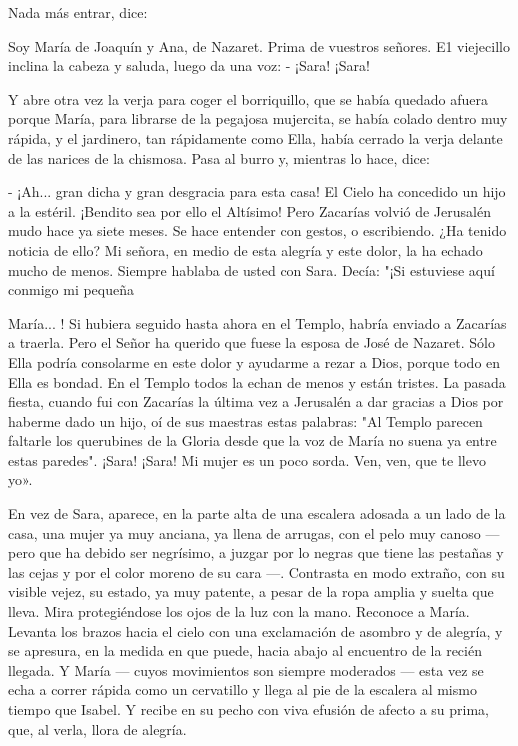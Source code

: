 \documentclass[12pt]{book} %
\begin{document}
Nada más entrar, dice: 

Soy María de Joaquín y Ana, de Nazaret. Prima de vuestros señores. E1 viejecillo inclina la cabeza y saluda, luego da una voz: - ¡Sara! ¡Sara! 

Y abre otra vez la verja para coger el borriquillo, que se había quedado afuera porque María, para librarse de la pegajosa mujercita, se había colado dentro muy rápida, y el jardinero, tan rápidamente como Ella, había cerrado la verja delante de las narices de la chismosa. Pasa al burro y, mientras lo hace, dice: 

- ¡Ah... gran dicha y gran desgracia para esta casa! El Cielo ha concedido un hijo a la estéril. ¡Bendito sea por ello el Altísimo! Pero Zacarías volvió de Jerusalén mudo hace ya siete meses. Se hace entender con gestos, o escribiendo. ¿Ha tenido noticia de ello? Mi señora, en medio de esta alegría y este dolor, la ha echado mucho de menos. Siempre hablaba de usted con Sara. Decía: "¡Si estuviese aquí conmigo mi pequeña 

María... ! Si hubiera seguido hasta ahora en el Templo, habría enviado a Zacarías a traerla. Pero el Señor ha querido que fuese la esposa de José de Nazaret. Sólo Ella podría consolarme en este dolor y ayudarme a rezar a Dios, porque todo en Ella es bondad. En el Templo todos la echan de menos y están tristes. La pasada fiesta, cuando fui con Zacarías la última vez a Jerusalén a dar gracias a Dios por haberme dado un hijo, oí de sus maestras estas palabras: "Al Templo parecen faltarle los querubines de la Gloria desde que la voz de María no suena ya entre estas paredes". ¡Sara! ¡Sara! Mi mujer es un poco sorda. Ven, ven, que te llevo yo». 

En vez de Sara, aparece, en la parte alta de una escalera adosada a un lado de la casa, una mujer ya muy anciana, ya llena de arrugas, con el pelo muy canoso — pero que ha debido ser negrísimo, a juzgar por lo negras que tiene las pestañas y las cejas y por el color moreno de su cara —. Contrasta en modo extraño, con su visible vejez, su estado, ya muy patente, a pesar de la ropa amplia y suelta que lleva. Mira protegiéndose los ojos de la luz con la mano. Reconoce a María. Levanta los brazos hacia el cielo con una exclamación de asombro y de alegría, y se apresura, en la medida en que puede, hacia abajo al encuentro de la recién llegada. Y María — cuyos movimientos son siempre moderados — esta vez se echa a correr rápida como un cervatillo y llega al pie de la escalera al mismo tiempo que Isabel. Y recibe en su pecho con viva efusión de afecto a su prima, que, al verla, llora de alegría. 
\end{document}
